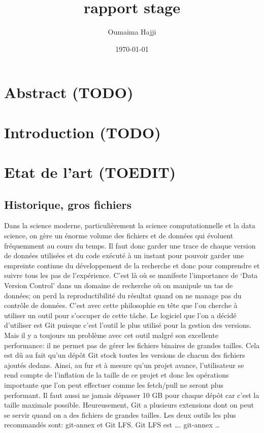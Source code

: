 \documentclass[11pt]{article}
\author{Oumaima Hajji}
\date{\today}
\title{rapport stage}
\begin{document}
\maketitle
\tableofcontents



\section{Abstract (TODO)}
\label{sec:orga884902}
\section{Introduction (TODO)}
\label{sec:org9349393}
\section{Etat de l'art (TOEDIT)}
\label{sec:org4f9f1b7}
\subsection{Historique, gros fichiers}
\label{sec:org6746f50}
Dans la science moderne, particulièrement la science computationnelle
et la data science, on gère un énorme volume des fichiers et de
données qui évoluent fréquemment au cours du temps. Il faut donc
garder une trace de chaque version de données utilisées et du code
exécuté à un instant pour pouvoir garder une empreinte continue du
développement de la recherche et donc pour comprendre et suivre tous
les pas de l'expérience. C’est là où se manifeste l’importance de
‘Data Version Control’ dans un domaine de recherche où on manipule un
tas de données; on perd la reproductibilité du résultat quand on ne
manage pas du contrôle de données. C’est avec cette philosophie en
tête que l’on cherche à utiliser un outil pour s’occuper de cette
tâche.  Le logiciel que l’on a décidé d’utiliser est Git puisque c’est
l’outil le plus utilisé pour la gestion des versions. Mais il y a
toujours un problème avec cet outil malgré son excellente performance:
il ne permet pas de gérer les fichiers binaires de grandes
tailles. Cela est dû au fait qu’un dépôt Git stock toutes les versions
de chacun des fichiers ajoutés dedans. Ainsi, au fur et à mesure qu’un
projet avance, l’utilisateur se rend compte de l’inflation de la
taille de ce projet  et donc les opérations importante que l’on peut
effectuer comme les fetch/pull ne seront plus performant. Il faut
aussi ne jamais dépasser 10 GB pour chaque dépôt car c’est la taille
maximale possible. Heureusement, Git a plusieurs extensions dont on
peut se servir quand on a des fichiers de grandes tailles. Les deux
outils les plus recommandés sont: git-annex et Git LFS.
Git LFS est ….
git-annex \ldots{}
\end{document}
